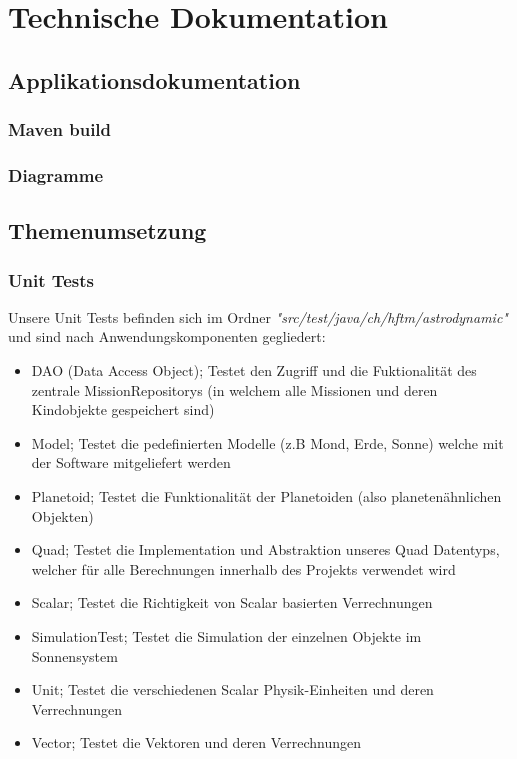 \chapter{Technische Dokumentation}

\section{Applikationsdokumentation}

\subsection{Maven build}

\subsection{Diagramme}

\section{Themenumsetzung}

\subsection{Unit Tests}

Unsere Unit Tests befinden sich im Ordner \textit{"src/test/java/ch/hftm/astrodynamic"} und sind nach Anwendungskomponenten gegliedert:

\begin{itemize}
	\item DAO (Data Access Object); Testet den Zugriff und die Fuktionalität des zentrale MissionRepositorys (in welchem alle Missionen und deren Kindobjekte gespeichert sind)
	\item Model; Testet die pedefinierten Modelle (z.B Mond, Erde, Sonne) welche mit der Software mitgeliefert werden
	\item Planetoid; Testet die Funktionalität der Planetoiden (also planetenähnlichen Objekten)
	\item Quad; Testet die Implementation und Abstraktion unseres Quad Datentyps, welcher für alle Berechnungen innerhalb des Projekts verwendet wird
	\item Scalar; Testet die Richtigkeit von Scalar basierten Verrechnungen
	\item SimulationTest; Testet die Simulation der einzelnen Objekte im Sonnensystem
	\item Unit; Testet die verschiedenen Scalar Physik-Einheiten und deren Verrechnungen
	\item Vector; Testet die Vektoren und deren Verrechnungen
\end{itemize}

